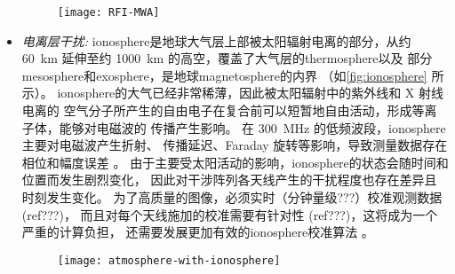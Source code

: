 \begin{itemize}
\begin{figure}[tbp]
  \centering
  \texttt{[image: RFI-MWA]}
  \label{fig:rfi-mwa}
\end{figure}

\item
\emph{电离层干扰:}
\ac{ionosphere}是地球大气层上部被太阳辐射电离的部分，从约 \SI{60}{\km}
延伸至约 \SI{1000}{\km} 的高空，覆盖了大气层的\ac{thermosphere}以及
部分\ac{mesosphere}和\ac{exosphere}，是地球\ac{magnetosphere}的内界
（如\autoref{fig:ionosphere} 所示）。
\acl{ionosphere}的大气已经非常稀薄，因此被太阳辐射中的紫外线和 X 射线电离的
空气分子所产生的自由电子在复合前可以短暂地自由活动，形成等离子体，能够对电磁波的
传播产生影响。
在 \SI{300}{\MHz} 的低频波段，\acl{ionosphere}主要对电磁波产生折射、
传播延迟、Faraday 旋转等影响，导致测量数据存在相位和幅度误差
\cite{intema2009,thompson2017}。
由于主要受太阳活动的影响，\acl{ionosphere}的状态会随时间和位置而发生剧烈变化，
因此对干涉阵列各天线产生的干扰程度也存在差异且时刻发生变化。
为了高质量的图像，必须实时（分钟量级???）校准观测数据 (ref???)，
而且对每个天线施加的校准需要有针对性 (ref???)，这将成为一个严重的计算负担，
还需要发展更加有效的\acl{ionosphere}校准算法 \cite{intema2009,deGasperin2018}。

\begin{figure}[tbp]
  \centering
  \texttt{[image: atmosphere-with-ionosphere]}
  \label{fig:ionosphere}
\end{figure}


\end{itemize}
